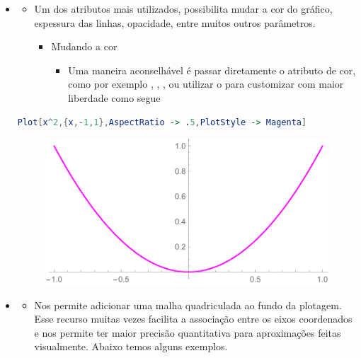 \documentclass[a4paper, 12pt]{article}
\begin{document}
\begin{itemize}
		\item{} 
			\begin{itemize}
				\item Um dos atributos mais utilizados, possibilita mudar a cor do gráfico, espessura das linhas, opacidade, entre muitos outros parâmetros. 
				\begin{itemize}
					\item Mudando a cor
					\begin{itemize}
						\item Uma maneira aconselhável é passar diretamente o atributo de cor, como por exemplo , , ,  ou utilizar o  para customizar com maior liberdade como segue
					\end{itemize}
				\end{itemize}
			\end{itemize}
		
\begin{lstlisting}[language=Mathematica]
Plot[x^2,{x,-1,1},AspectRatio -> .5,PlotStyle -> Magenta]
\end{lstlisting}

\begin{figure}[!h]\label{parabola}
	\centering
	\includegraphics[scale=.55]{images/magenta}
\end{figure}

		\item{} 
		\begin{itemize}
			\item Nos permite adicionar uma malha quadriculada ao fundo da plotagem. Esse recurso muitas vezes facilita a associação entre os eixos coordenados e nos permite ter maior precisão quantitativa para aproximações feitas visualmente. Abaixo temos alguns exemplos.
		\end{itemize}



\end{itemize}
\end{document}
